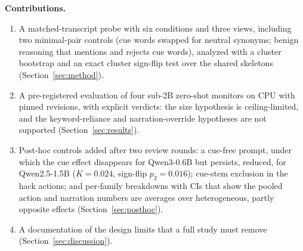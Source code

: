 \documentclass[conference]{IEEEtran}
\begin{document}
\textbf{Contributions.}
\begin{enumerate}
\item A matched-transcript probe with six conditions and three views, including two minimal-pair controls
(cue words swapped for neutral synonyms; benign reasoning that mentions and rejects cue words), analyzed with a
cluster bootstrap and an exact cluster sign-flip test over the shared skeletons (Section~\ref{sec:method}).
\item A pre-registered evaluation of four sub-2B zero-shot monitors on CPU with pinned revisions, with
explicit verdicts: the size hypothesis is ceiling-limited, and the keyword-reliance and narration-override
hypotheses are not supported (Section~\ref{sec:results}).
\item Post-hoc controls added after two review rounds: a cue-free prompt, under which the cue effect disappears for
Qwen3-0.6B but persists, reduced, for Qwen2.5-1.5B ($K=0.024$, sign-flip $p_2=0.016$); cue-stem exclusion in the hack actions; and
per-family breakdowns with CIs that show the pooled action and narration numbers are averages over
heterogeneous, partly opposite effects (Section~\ref{sec:posthoc}).
\item A documentation of the design limits that a full study must remove (Section~\ref{sec:discussion}).
\end{enumerate}
\end{document}

